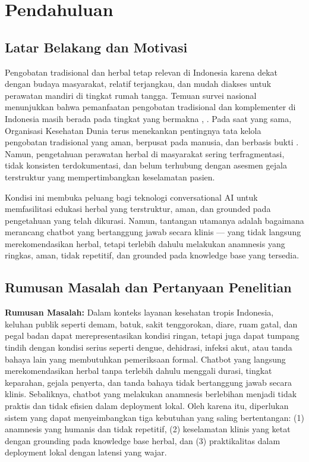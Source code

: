 \documentclass[conference]{IEEEtran}
\begin{document}
\section{Pendahuluan}

\subsection{Latar Belakang dan Motivasi}
Pengobatan tradisional dan herbal tetap relevan di Indonesia karena dekat dengan budaya masyarakat, relatif terjangkau, dan mudah diakses untuk perawatan mandiri di tingkat rumah tangga. Temuan survei nasional menunjukkan bahwa pemanfaatan pengobatan tradisional dan komplementer di Indonesia masih berada pada tingkat yang bermakna \cite{b1}, \cite{b2}. Pada saat yang sama, Organisasi Kesehatan Dunia terus menekankan pentingnya tata kelola pengobatan tradisional yang aman, berpusat pada manusia, dan berbasis bukti \cite{b3}. Namun, pengetahuan perawatan herbal di masyarakat sering terfragmentasi, tidak konsisten terdokumentasi, dan belum terhubung dengan asesmen gejala terstruktur yang mempertimbangkan keselamatan pasien.

Kondisi ini membuka peluang bagi teknologi conversational AI untuk memfasilitasi edukasi herbal yang terstruktur, aman, dan grounded pada pengetahuan yang telah dikurasi. Namun, tantangan utamanya adalah bagaimana merancang chatbot yang bertanggung jawab secara klinis — yang tidak langsung merekomendasikan herbal, tetapi terlebih dahulu melakukan anamnesis yang ringkas, aman, tidak repetitif, dan grounded pada knowledge base yang tersedia.

\subsection{Rumusan Masalah dan Pertanyaan Penelitian}
\textbf{Rumusan Masalah:} Dalam konteks layanan kesehatan tropis Indonesia, keluhan publik seperti demam, batuk, sakit tenggorokan, diare, ruam gatal, dan pegal badan dapat merepresentasikan kondisi ringan, tetapi juga dapat tumpang tindih dengan kondisi serius seperti dengue, dehidrasi, infeksi akut, atau tanda bahaya lain yang membutuhkan pemeriksaan formal. Chatbot yang langsung merekomendasikan herbal tanpa terlebih dahulu menggali durasi, tingkat keparahan, gejala penyerta, dan tanda bahaya tidak bertanggung jawab secara klinis. Sebaliknya, chatbot yang melakukan anamnesis berlebihan menjadi tidak praktis dan tidak efisien dalam deployment lokal. Oleh karena itu, diperlukan sistem yang dapat menyeimbangkan tiga kebutuhan yang saling bertentangan: (1) anamnesis yang humanis dan tidak repetitif, (2) keselamatan klinis yang ketat dengan grounding pada knowledge base herbal, dan (3) praktikalitas dalam deployment lokal dengan latensi yang wajar.
\end{document}
